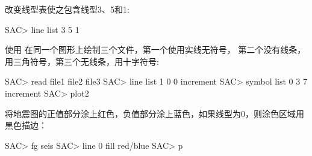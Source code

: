 改变线型表使之包含线型3、5和1:
\begin{SACCode}
SAC> line list 3 5 1
\end{SACCode}

使用  在同一个图形上绘制三个文件，第一个使用实线无符号，
第二个没有线条，用三角符号，第三个无线条，用十字符号:
\begin{SACCode}
SAC> read file1 file2 file3
SAC> line list 1 0 0 increment
SAC> symbol list 0 3 7 increment
SAC> plot2
\end{SACCode}

将地震图的正值部分涂上红色，负值部分涂上蓝色，如果线型为0，则涂色区域用黑色描边：
\begin{SACCode}
SAC> fg seis
SAC> line 0 fill red/blue
SAC> p
\end{SACCode}
